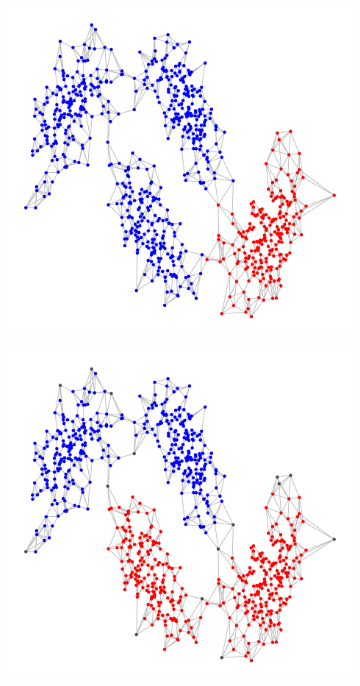 \documentclass{article}
\newcommand{\1}{\mathbf{1}}
\theoremstyle{aldenthm}
\begin{document}
\begin{figure}
\begin{adjustbox}{minipage=\linewidth,scale=0.8}
\begin{subfigure}{.24\linewidth}
			\caption{}
		\end{subfigure}
		\begin{subfigure}{.24\linewidth}
			\includegraphics[width=\linewidth,scale = .5]{example3plots/conductance_cluster}
			\caption{}
		\end{subfigure}
		\begin{subfigure}{.24\linewidth}
			\includegraphics[width=\linewidth,scale = .5]{example3plots/density_cluster}
			\caption{}
		\end{subfigure}
	\caption{}
	\end{adjustbox}
\end{figure}
\end{document}
